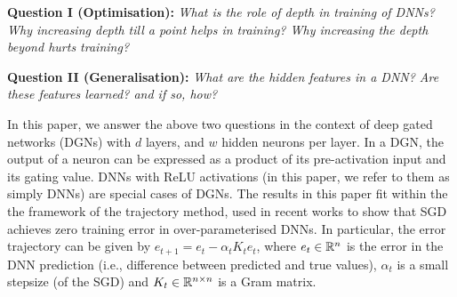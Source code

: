 \documentclass{article}
\begin{document}
\textbf{Question I (Optimisation):} \emph{What is the role of depth in training of DNNs? Why increasing depth till a point helps in training? Why increasing the depth beyond hurts training?}\\
\begin{comment}We call the above  questions are the depth phenomena. \cite{dudnn} show that, when it comes to training, residual networks are better than simple FC-DNNs. However, the depth phenomena in the case of simple FC-DNNs is still unresolved.
\end{comment}
\textbf{Question II (Generalisation):} \emph{What are the hidden features in a DNN? Are these features learned? and if so, how?}
\begin{comment}The general consensus is that, the DNNs learn hidden representations progressively in each of the intermediate layers, and the final layer learns a linear model using features obtained in the penultimate layer.  This view, while conceptually simple, however, does not provide us any analytical insight regarding the above question.  A more analytically appealing candidate for the hidden representation (used in some of the recent works \cite{}) is the \emph{neural tangent random feature} (NTRF) which is the NTF evaluated at randomised initialisation of an infinitely wide DNN. \cite{} provides generalisation bounds in terms of the Rademacher complexity of the class of functions defined by the NTRF and also in terms of an associated neural tangent kernel (NTK). \cite{} uses NTK to set a significant new benchmark for pure-kernel based learning.  An issue with the NTRF/NTK approach is that the features do not change over the training of the DNN, thus implying no feature learning is happening, and yet experimental evidence (in \cite{} as well as \Cref{sec:generalisation-exp}) shows that DNNs perform significantly better than pure-kernel learning with NTK.
\end{comment}

In this paper, we answer the above two questions in the context of deep gated networks (DGNs) with $d$ layers, and $w$ hidden neurons per layer.  In a DGN, the output of a neuron can be expressed as a product of its pre-activation input and its gating value. DNNs with ReLU activations (in this paper, we refer to them as simply DNNs) are special cases of DGNs. The results in this paper fit within the the framework of the trajectory method, used in recent works \cite{} to show that SGD achieves zero training error in over-parameterised DNNs. In particular, the error trajectory can be given by $e_{t+1}=e_t-\alpha_tK_te_t$, where $e_t\in \mathbb{R}^n$ is the error in the DNN prediction (i.e., difference between predicted and true values), $\alpha_t$ is a small stepsize (of the SGD) and $K_t\in\mathbb{R}^{n\times n}$ is a Gram matrix. 
\end{document}
